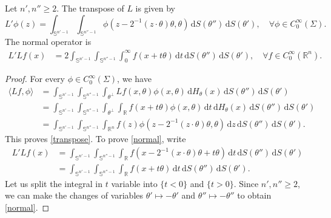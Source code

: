 \documentclass[10pt,a4paper]{amsart}
\newcommand{\Rn}{\mathbb{R}^n}
\newcommand{\rb}{\mathbb{R}}
\renewcommand{\d}{\,\mathrm{d}}
\renewcommand{\sb}{\mathbb{S}}
\begin{document}
\begin{theorem}\label{th:normal}
	Let $n', n'' \geq 2$. The transpose of $L$ is given by 
	\begin{equation}\label{transpose}
		L' \phi (z) = \int_{\sb^{n'-1}} \int_{\sb^{n''-1}} \phi(z- {2^{-1}}(z \cdot \theta) \theta, \theta) \d S(\theta'') \d S(\theta'), \quad \forall \phi\in C_0^\infty(\Sigma). 
	\end{equation}
The normal operator is
	\begin{align}\label{normal}
		L'Lf(x) &= 2 \int_{\sb^{n'-1}} \int_{\sb^{n''-1}} \int_{0}^{\infty} f\left ( x + t \theta \right) \d  t \d S(\theta'') \d S(\theta'), \quad \forall f\in C_0^\infty(\rb^n). 
	\end{align}
\end{theorem}

\begin{proof}
	 For every $\phi\in C_0^\infty(\Sigma)$, we have 
\begin{equation}
    \begin{split}
        \langle Lf, \phi \rangle &= \int_{\sb^{n'-1}} \int_{\sb^{n''-1}}   \int_{\theta^\perp} Lf (x, \theta) \phi (x, \theta) \d H_\theta(x)  \d S(\theta'') \d S(\theta')\\
        &= \int_{\sb^{n'-1}} \int_{\sb^{n''-1}}   \int_{\theta^\perp} \int_{\rb} f (x+ t \theta) \phi (x, \theta) \d t \d H_\theta(x) \d S(\theta'') \d S(\theta') \\
        &= \int_{\sb^{n'-1}} \int_{\sb^{n''-1}}   \int_{\Rn} f (z) \phi (z- {2^{-1}}(z\cdot\theta)\theta, \theta)\d z \d S(\theta'') \d S(\theta')   .    
    \end{split}
\end{equation}
This proves \eqref{transpose}.  To prove \eqref{normal}, write 
\begin{align}
	L'Lf(x) &= \int_{\sb^{n'-1}} \int_{\sb^{n''-1}} \int_{\rb} f\left ( x - {2^{-1}}(x\cdot  \theta )  \theta + t \theta \right) \d  t \d S(\theta'') \d S(\theta') \\
	&= \int_{\sb^{n'-1}} \int_{\sb^{n''-1}} \int_{\rb} f\left ( x + t \theta \right) \d  t \d S(\theta'') \d S(\theta').  \label{L'Lf}
\end{align}
Let us split the integral in $t$ variable into $\{t < 0\}$ and $\{t> 0\}$. Since $n',n'' \geq 2$, we can make the changes of variables $\theta' \mapsto -\theta'$ and $\theta'' \mapsto -\theta''$ to obtain \eqref{normal}. 
\end{proof}
\end{document}
